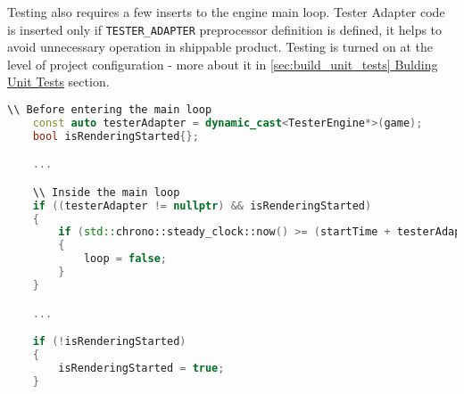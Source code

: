 Testing also requires a few inserts to the engine main loop. Tester Adapter code is inserted only if \texttt{TESTER\_ADAPTER} preprocessor definition is defined, it helps to avoid unnecessary operation in shippable product. Testing is turned on at the level of project configuration - more about it in \hyperref[sec:build_unit_tests]{\ref*{sec:build_unit_tests} Bulding Unit Tests} section. 
\begin{lstlisting}[language=c++, caption=Tester related code inside Engine Main Loop (./engine/src/core/core.cpp)]
    \\ Before entering the main loop
    const auto testerAdapter = dynamic_cast<TesterEngine*>(game);
    bool isRenderingStarted{};

    ...

    \\ Inside the main loop
    if ((testerAdapter != nullptr) && isRenderingStarted)
    {
        if (std::chrono::steady_clock::now() >= (startTime + testerAdapter->renderingDuration))
        {
            loop = false;
        }
    }

    ...

    if (!isRenderingStarted)
    {
        isRenderingStarted = true;
    }
\end{lstlisting}

